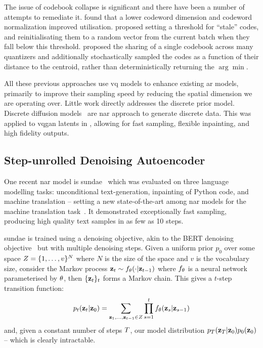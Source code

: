 The issue of codebook collapse is significant and there have been a number
of attempts to remediate it. \cite{yu2021vqgan} found that a lower codeword
dimension and codeword normalization improved utilisation.
\cite{zeghidour2021soundstream} proposed setting a threshold for ``stale'' codes,
and reinitialisating them to a random vector from the current batch when they
fall below this threshold. \cite{lee2022rqvae} proposed the sharing of a single
codebook across many quantizers and additionally stochastically sampled the
codes as a function of their distance to the centroid, rather than
deterministically returning the $\arg\min$.

All these previous approaches use \gls{vq} models to enhance existing \gls{ar}
models, primarily to improve their sampling speed by reducing the spatial
dimension we are operating over. Little work directly addresses the discrete
prior model. Discrete diffusion models~\cite{austin2021structured} are
\gls{nar} approach to generate discrete data. This was applied to \gls{vqgan}
latents in \citet{bondtaylor2021unleashing}, allowing for fast sampling,
flexible inpainting, and high fidelity outputs.

\subsection{Step-unrolled Denoising Autoencoder}
\label{subsec:sundae}

One recent \gls{nar} model is \gls{sundae}~\cite{savinov2022stepunrolled} which
was evaluated on three language modelling tasks: unconditional text-generation,
inpainting of Python code, and machine translation -- setting a new
state-of-the-art among \gls{nar} models for the machine translation
task~\cite{savinov2022stepunrolled}. It demonstrated exceptionally fast
sampling, producing high quality text samples in as few as 10 steps.

\Gls{sundae} is trained using a denoising objective, akin to the
BERT denoising objective~\cite{wang2019bert} but with multiple denoising steps.
Given a uniform prior $p_0$ over some space $Z = \{1, \dots,
v\}^N$ where $N$ is the size of the space and $v$ is the
vocabulary size, consider the Markov process $\mathbf{z}_t \sim f_\theta(\cdot \vert
\mathbf{z}_{t-1})$ where $f_\theta$ is a neural network parameterised by
$\theta$, then $\{\mathbf{z}_t\}_t$ forms a Markov chain. This gives a
$t$-step transition function: 
\begin{equation}\label{eq:markov} p_t(\mathbf{z}_t
    \vert \mathbf{z}_0) = \sum\limits_{\mathbf{z}_1, \dots, \mathbf{z}_{t-1} \in
    Z} \prod\limits^t_{s=1} f_\theta(\mathbf{z}_s | \mathbf{z}_{s-1})
\end{equation}
\cite{savinov2022stepunrolled} and, given a constant number of steps
$T$, our model distribution $p_T(\mathbf{z}_T
\vert \mathbf{z}_0)p_0(\mathbf{z}_0)$ -- which is clearly intractable.

